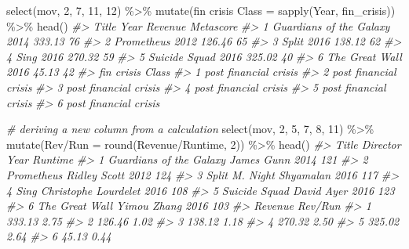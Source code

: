 \documentclass[
]{book}
\newenvironment{Shaded}{\begin{snugshade}}{\end{snugshade}}
\newcommand{\CommentTok}[1]{\textcolor[rgb]{0.56,0.35,0.01}{\textit{#1}}}
\newcommand{\DecValTok}[1]{\textcolor[rgb]{0.00,0.00,0.81}{#1}}
\newcommand{\FunctionTok}[1]{\textcolor[rgb]{0.00,0.00,0.00}{#1}}
\newcommand{\NormalTok}[1]{#1}
\newcommand{\OtherTok}[1]{\textcolor[rgb]{0.56,0.35,0.01}{#1}}
\newcommand{\SpecialCharTok}[1]{\textcolor[rgb]{0.00,0.00,0.00}{#1}}
\newcommand{\StringTok}[1]{\textcolor[rgb]{0.31,0.60,0.02}{#1}}
\begin{document}
\begin{Shaded}
\begin{Highlighting}[]
\FunctionTok{select}\NormalTok{(mov, }\DecValTok{2}\NormalTok{, }\DecValTok{7}\NormalTok{, }\DecValTok{11}\NormalTok{, }\DecValTok{12}\NormalTok{) }\SpecialCharTok{\%\textgreater{}\%}
  \FunctionTok{mutate}\NormalTok{(}\StringTok{\textquotesingle{}fin crisis Class\textquotesingle{}} \OtherTok{=} \FunctionTok{sapply}\NormalTok{(Year, fin\_crisis)) }\SpecialCharTok{\%\textgreater{}\%}
  \FunctionTok{head}\NormalTok{()}
\CommentTok{\#\textgreater{}                     Title Year Revenue Metascore}
\CommentTok{\#\textgreater{} 1 Guardians of the Galaxy 2014  333.13        76}
\CommentTok{\#\textgreater{} 2              Prometheus 2012  126.46        65}
\CommentTok{\#\textgreater{} 3                   Split 2016  138.12        62}
\CommentTok{\#\textgreater{} 4                    Sing 2016  270.32        59}
\CommentTok{\#\textgreater{} 5           Suicide Squad 2016  325.02        40}
\CommentTok{\#\textgreater{} 6          The Great Wall 2016   45.13        42}
\CommentTok{\#\textgreater{}        fin crisis Class}
\CommentTok{\#\textgreater{} 1 post financial crisis}
\CommentTok{\#\textgreater{} 2 post financial crisis}
\CommentTok{\#\textgreater{} 3 post financial crisis}
\CommentTok{\#\textgreater{} 4 post financial crisis}
\CommentTok{\#\textgreater{} 5 post financial crisis}
\CommentTok{\#\textgreater{} 6 post financial crisis}

\CommentTok{\# deriving a new column from a calculation  }
\FunctionTok{select}\NormalTok{(mov, }\DecValTok{2}\NormalTok{, }\DecValTok{5}\NormalTok{, }\DecValTok{7}\NormalTok{, }\DecValTok{8}\NormalTok{, }\DecValTok{11}\NormalTok{) }\SpecialCharTok{\%\textgreater{}\%}
  \FunctionTok{mutate}\NormalTok{(}\StringTok{\textquotesingle{}Rev/Run\textquotesingle{}} \OtherTok{=} \FunctionTok{round}\NormalTok{(Revenue}\SpecialCharTok{/}\NormalTok{Runtime, }\DecValTok{2}\NormalTok{)) }\SpecialCharTok{\%\textgreater{}\%}
  \FunctionTok{head}\NormalTok{()}
\CommentTok{\#\textgreater{}                     Title             Director Year Runtime}
\CommentTok{\#\textgreater{} 1 Guardians of the Galaxy           James Gunn 2014     121}
\CommentTok{\#\textgreater{} 2              Prometheus         Ridley Scott 2012     124}
\CommentTok{\#\textgreater{} 3                   Split   M. Night Shyamalan 2016     117}
\CommentTok{\#\textgreater{} 4                    Sing Christophe Lourdelet 2016     108}
\CommentTok{\#\textgreater{} 5           Suicide Squad           David Ayer 2016     123}
\CommentTok{\#\textgreater{} 6          The Great Wall          Yimou Zhang 2016     103}
\CommentTok{\#\textgreater{}   Revenue Rev/Run}
\CommentTok{\#\textgreater{} 1  333.13    2.75}
\CommentTok{\#\textgreater{} 2  126.46    1.02}
\CommentTok{\#\textgreater{} 3  138.12    1.18}
\CommentTok{\#\textgreater{} 4  270.32    2.50}
\CommentTok{\#\textgreater{} 5  325.02    2.64}
\CommentTok{\#\textgreater{} 6   45.13    0.44}
\end{Highlighting}
\end{Shaded}
\end{document}
